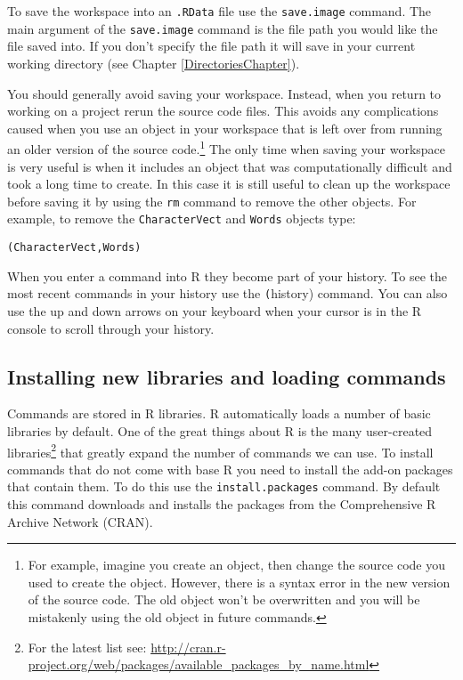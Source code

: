 To save the workspace into an \texttt{.RData} file use the \texttt{save.image} command. The main argument of the \texttt{save.image} command is the file path you would like the file saved into. If you don't specify the file path it will save in your current working directory (see Chapter \ref{DirectoriesChapter}). 

You should generally avoid saving your workspace. Instead, when you return to working on a project rerun the source code files. This avoids any complications caused when you use an object in your workspace that is left over from running an older version of the source code.\footnote{For example, imagine you create an object, then change the source code you used to create the object. However, there is a syntax error in the new version of the source code. The old object won't be overwritten and you will be mistakenly using the old object in future commands.} The only time when saving your workspace is very useful is when it includes an object that was computationally difficult and took a long time to create. In this case it is still useful to clean up the workspace before saving it by using the \texttt{rm} command to remove the other objects. For example, to remove the \texttt{CharacterVect} and \texttt{Words} objects type:

\begin{knitrout}
\color{fgcolor}\begin{kframe}
\begin{alltt}
(CharacterVect, Words)
\end{alltt}
\end{kframe}
\end{knitrout}


When you enter a command into R they become part of your history. To see the most recent commands in your history use the \texttt(history) command. You can also use the up and down arrows on your keyboard when your cursor is in the R console to scroll through your history.

\subsection{Installing new libraries and loading commands}\label{Packages}

Commands are stored in R libraries. R automatically loads a number of basic libraries by default. One of the great things about R is the many user-created libraries\footnote{For the latest list see: \url{http://cran.r-project.org/web/packages/available_packages_by_name.html}} that greatly expand the number of commands we can use. To install commands that do not come with base R you need to install the add-on packages\label{packages} that contain them. To do this use the {\tt{install.packages}} command. By default this command downloads and installs the packages from the Comprehensive R Archive Network (CRAN). 


